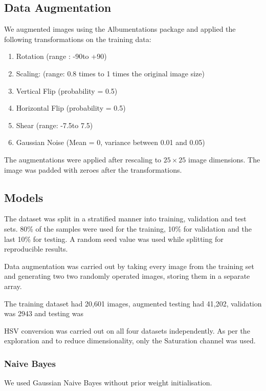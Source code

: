 \documentclass[10pt,twocolumn,letterpaper]{article}
\begin{document}
\subsection{Data Augmentation}

We augmented images using the Albumentations package \cite{info11020125} and applied the following transformations on the training data:
\begin{enumerate}
   \item Rotation (range : -90\textdegree to +90\textdegree)
   \item Scaling: (range: 0.8 times to 1 times the original image size)
   \item Vertical Flip (probability = 0.5)
   \item Horizontal Flip (probability = 0.5)
   \item Shear (range: -7.5\textdegree to 7.5\textdegree)
   \item Gaussian Noise (Mean = 0, variance between 0.01 and 0.05)
\end{enumerate}

The augmentations were applied after rescaling to $25 \times 25$ image dimensions. The image was padded with zeroes after the transformations.

\subsection{Models}
The dataset was split in a stratified manner into training, validation and test sets. 80\% of the samples were used for the training, 10\% for validation and the last 10\% for testing. A random seed value was used while splitting for reproducible results.

Data augmentation was carried out by taking every image from the training set and generating two two randomly operated images, storing them in a separate array. 

The training dataset had 20,601 images, augmented testing had 41,202, validation was 2943 and testing was 

HSV conversion was carried out on all four datasets independently. As per the exploration and to reduce dimensionality, only the Saturation channel was used.


\subsubsection{Naive Bayes}
We used Gaussian Naive Bayes without prior weight initialisation. 
\end{document}
